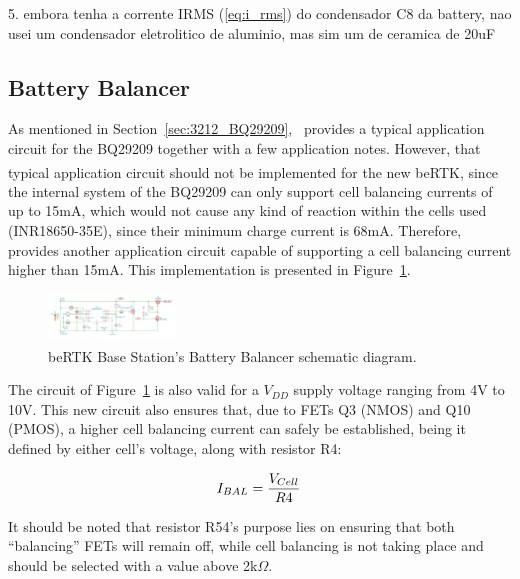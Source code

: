 5. embora tenha a corrente IRMS (\ref{eq:i_rms}) do condensador C8 da battery, nao usei um condensador eletrolitico de aluminio, mas sim um de ceramica de 20uF



\subsection{Battery Balancer}\label{sec:6_BQ29209}
As mentioned in Section~\ref{sec:3212_BQ29209},~\cite{bq29209} provides a typical application circuit for the BQ29209 together with a few application notes. However, that typical application circuit should not be implemented for the new beRTK\textsuperscript{\textregistered}, since the internal system of the BQ29209 can only support cell balancing currents of up to 15mA, which would not cause any kind of reaction within the cells used (INR18650-35E), since their minimum charge current is 68mA. Therefore,~\cite{bq29209} provides another application circuit capable of supporting a cell balancing current higher than 15mA. This implementation is presented in Figure~\ref{fig:BQ29209_circuit_NEW}.
\begin{figure}[h]
    \centering
    \includegraphics[width=0.3\textwidth]{Chapters/Figures/chapter3/Battery_Balancer.pdf}
    \caption{beRTK\textsuperscript{\textregistered} Base Station's Battery Balancer schematic diagram.}
    \label{fig:BQ29209_circuit_NEW}
\end{figure}

The circuit of Figure~\ref{fig:BQ29209_circuit_NEW} is also valid for a $V_{DD}$ supply voltage ranging from 4V to 10V. This new circuit also ensures that, due to FETs Q3 (NMOS) and Q10 (PMOS), a higher cell balancing current can safely be established, being it defined by either cell's voltage, along with resistor R4:

\begin{equation}\label{eq:IBAL}
	I_{BAL}=\frac{V_{Cell}}{R4}\,\medskip
\end{equation}

\noindent It should be noted that resistor R54's purpose lies on ensuring that both ``balancing'' FETs will remain off, while cell balancing is not taking place and should be selected with a value above 2k$\Omega$.

